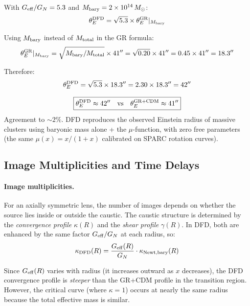 \documentclass[11pt,a4paper]{article}
\newcommand{\Geff}{G_{\rm eff}}
\newcommand{\ee}[1]{\times 10^{#1}}
\begin{document}
With $\Geff/G_N = 5.3$ and $M_{\rm bary} = 2\ee{14}\,M_\odot$:
\begin{equation}
\theta_E^{\rm DFD} = \sqrt{5.3} \times \theta_E^{\rm GR}|_{M_{\rm bary}}
\end{equation}

Using $M_{\rm bary}$ instead of $M_{\rm total}$ in the GR formula:
\begin{equation}
\theta_E^{\rm GR}|_{M_{\rm bary}} = \sqrt{M_{\rm bary}/M_{\rm total}}
\times 41'' = \sqrt{0.20} \times 41'' = 0.45 \times 41'' = 18.3''
\end{equation}

Therefore:
\begin{equation}
\theta_E^{\rm DFD} = \sqrt{5.3} \times 18.3'' = 2.30 \times 18.3'' = 42''
\end{equation}

\begin{tcolorbox}[colback=green!5!white, colframe=green!50!black,
  title=\textbf{Key Result: DFD Einstein Radius}]
\begin{equation}
\boxed{\theta_E^{\rm DFD} \approx 42'' \quad\text{vs}\quad
\theta_E^{\rm GR+CDM} \approx 41''}
\end{equation}
Agreement to $\sim 2\%$.  DFD reproduces the observed Einstein radius
of massive clusters using baryonic mass alone + the $\mu$-function,
with zero free parameters (the same $\mu(x) = x/(1+x)$ calibrated on
SPARC rotation curves).
\end{tcolorbox}

\subsection{Image Multiplicities and Time Delays}

\paragraph{Image multiplicities.}
For an axially symmetric lens, the number of images depends on whether
the source lies inside or outside the caustic.  The caustic structure
is determined by the \emph{convergence profile} $\kappa(R)$ and the
\emph{shear profile} $\gamma(R)$.  In DFD, both are enhanced by the
same factor $\Geff/G_N$ at each radius, so:
\begin{equation}
\kappa_{\rm DFD}(R) = \frac{\Geff(R)}{G_N} \cdot \kappa_{\rm Newt,bary}(R)
\end{equation}

Since $\Geff(R)$ varies with radius (it increases outward as $x$
decreases), the DFD convergence profile is \emph{steeper} than the
GR+CDM profile in the transition region.  However, the critical curve
(where $\kappa = 1$) occurs at nearly the same radius because the
total effective mass is similar.
\end{document}
